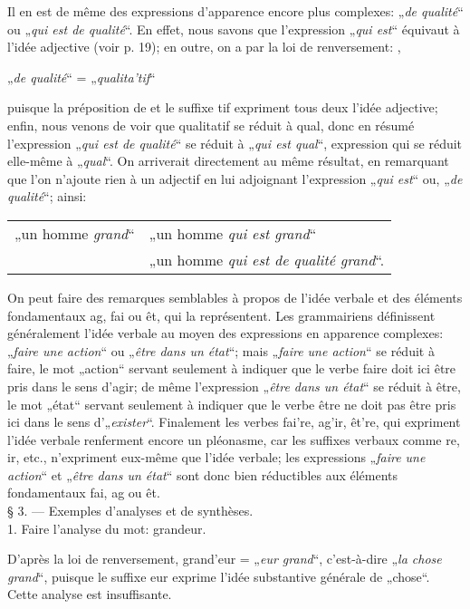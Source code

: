 {    Il en est de même des expressions d’apparence encore plus
    complexes: „\emph{de qualité}“ ou „\emph{qui est de qualité}“. En
    effet, nous savons que l’expression „\emph{qui est}“ équivaut à
    l’idée adjective (voir p. 19); en outre, on a par la loi de
    renversement: ,

    \begin{center}
      „\emph{de qualité}“ = „\emph{qualita'tif}“
    \end{center}

    \noindent
    puisque la préposition \textup{de} et le suffixe \textup{tif}
    expriment tous deux l’idée adjective; enfin, nous venons de voir
    que \textup{qualitatif} se réduit à \textup{qual}, donc en résumé
    l’expression „\emph{qui est de qualité}“ se réduit à „\emph{qui
      est qual}“, expression qui se réduit elle-même à
    „\emph{qual}“. On arriverait directement au même résultat, en
    remarquant que l’on n’ajoute rien à un adjectif en lui adjoignant
    l’expression „\emph{qui est}“ ou, „\emph{de qualité}“; ainsi:

    \begin{center}
      \begin{tabular}[t]{r@{ = }l}
        „un homme \emph{grand}“ & „un homme \emph{qui est grand}“\\
                                & „un homme \emph{qui est de qualité grand}“.
      \end{tabular}
    \end{center}

    On peut faire des remarques semblables à propos de l’idée verbale
    et des éléments fondamentaux \textup{ag}, \textup{fai} ou
    \textup{êt}, qui la représentent. Les grammairiens définissent
    généralement l’idée verbale au moyen des expressions en apparence
    complexes: „\emph{faire une action}“ ou „\emph{être dans un
      état}“; mais „\emph{faire une action}“ se réduit à
    \textup{faire}, le mot „action“ servant seulement à indiquer que
    le verbe \textup{faire} doit ici être pris dans le sens
    d’\textup{agir}; de même l’expression „\emph{être dans un état}“
    se réduit à \textup{être}, le mot „état“ servant seulement à
    indiquer que le verbe \textup{être} ne doit pas être pris ici dans
    le sens d'„\emph{exister}“. Finalement les verbes \textup{fai're},
    \textup{ag'ir}, \textup{êt're}, qui expriment l’idée verbale
    renferment encore un pléonasme, car les suffixes verbaux comme
    \textup{re}, \textup{ir}, etc., n’expriment eux-même que l’idée
    verbale; les expressions „\emph{faire une action}“ et
    „\emph{être dans un état}“ sont donc bien réductibles aux éléments
    fondamentaux \textup{fai}, \textup{ag} ou \textup{êt}.\\[1ex]

    {\large § 3. — \textsf{Exemples d’analyses et de synthèses.}}\\

    1. Faire l’analyse du mot: \textup{grandeur}.

    D’après la loi de renversement, \textup{grand'eur} = „\emph{eur
      grand}“, c’est-à-dire „\emph{la chose grand}“, puisque le
    suffixe \textup{eur} exprime l’idée substantive générale de
    „chose“. Cette analyse est insuffisante.}
  
